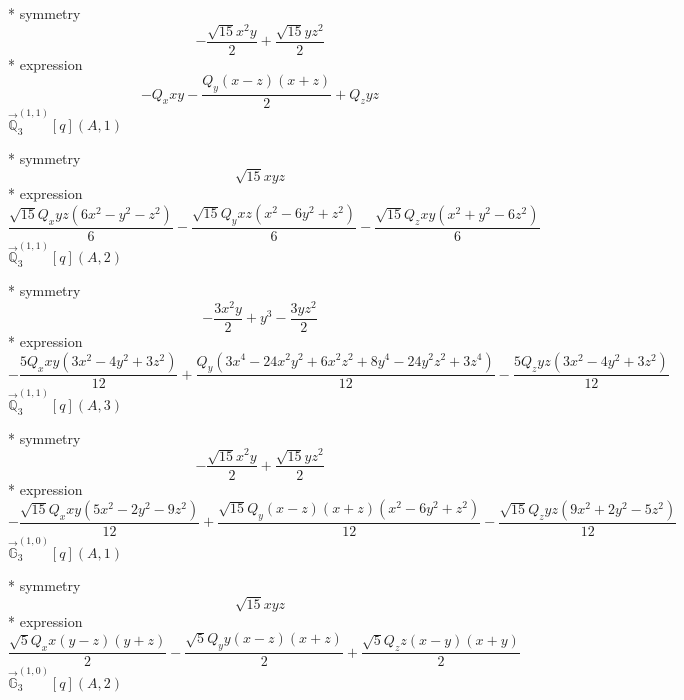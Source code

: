 \documentclass[fleqn,8pt]{jsarticle}
\begin{document}
\noindent\quad ** symmetry
\begin{dmath*}
- \frac{\sqrt{15} x^{2} y}{2} + \frac{\sqrt{15} y z^{2}}{2}
\end{dmath*}
\noindent\quad ** expression
\begin{dmath*}
- Q_{x} x y - \frac{Q_{y} \left(x - z\right) \left(x + z\right)}{2} + Q_{z} y z
\end{dmath*}
\noindent\quad $\vec{\mathbb{Q}}_{3}^{(1,1)}[q](A,1)$

\noindent\quad ** symmetry
\begin{dmath*}
\sqrt{15} x y z
\end{dmath*}
\noindent\quad ** expression
\begin{dmath*}
\frac{\sqrt{15} Q_{x} y z \left(6 x^{2} - y^{2} - z^{2}\right)}{6} - \frac{\sqrt{15} Q_{y} x z \left(x^{2} - 6 y^{2} + z^{2}\right)}{6} - \frac{\sqrt{15} Q_{z} x y \left(x^{2} + y^{2} - 6 z^{2}\right)}{6}
\end{dmath*}
\noindent\quad $\vec{\mathbb{Q}}_{3}^{(1,1)}[q](A,2)$

\noindent\quad ** symmetry
\begin{dmath*}
- \frac{3 x^{2} y}{2} + y^{3} - \frac{3 y z^{2}}{2}
\end{dmath*}
\noindent\quad ** expression
\begin{dmath*}
- \frac{5 Q_{x} x y \left(3 x^{2} - 4 y^{2} + 3 z^{2}\right)}{12} + \frac{Q_{y} \left(3 x^{4} - 24 x^{2} y^{2} + 6 x^{2} z^{2} + 8 y^{4} - 24 y^{2} z^{2} + 3 z^{4}\right)}{12} - \frac{5 Q_{z} y z \left(3 x^{2} - 4 y^{2} + 3 z^{2}\right)}{12}
\end{dmath*}
\noindent\quad $\vec{\mathbb{Q}}_{3}^{(1,1)}[q](A,3)$

\noindent\quad ** symmetry
\begin{dmath*}
- \frac{\sqrt{15} x^{2} y}{2} + \frac{\sqrt{15} y z^{2}}{2}
\end{dmath*}
\noindent\quad ** expression
\begin{dmath*}
- \frac{\sqrt{15} Q_{x} x y \left(5 x^{2} - 2 y^{2} - 9 z^{2}\right)}{12} + \frac{\sqrt{15} Q_{y} \left(x - z\right) \left(x + z\right) \left(x^{2} - 6 y^{2} + z^{2}\right)}{12} - \frac{\sqrt{15} Q_{z} y z \left(9 x^{2} + 2 y^{2} - 5 z^{2}\right)}{12}
\end{dmath*}
\noindent\quad $\vec{\mathbb{G}}_{3}^{(1,0)}[q](A,1)$

\noindent\quad ** symmetry
\begin{dmath*}
\sqrt{15} x y z
\end{dmath*}
\noindent\quad ** expression
\begin{dmath*}
\frac{\sqrt{5} Q_{x} x \left(y - z\right) \left(y + z\right)}{2} - \frac{\sqrt{5} Q_{y} y \left(x - z\right) \left(x + z\right)}{2} + \frac{\sqrt{5} Q_{z} z \left(x - y\right) \left(x + y\right)}{2}
\end{dmath*}
\noindent\quad $\vec{\mathbb{G}}_{3}^{(1,0)}[q](A,2)$
\end{document}
